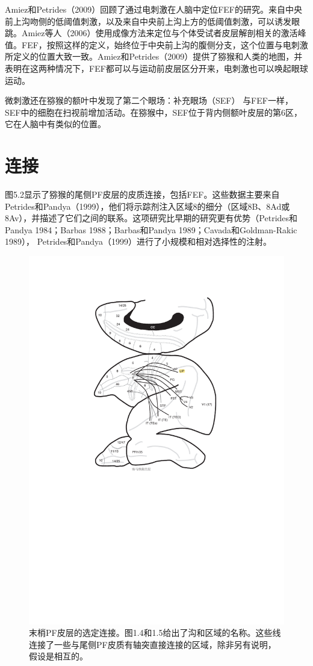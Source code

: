 Amiez和Petrides（2009）回顾了通过电刺激在人脑中定位FEF的研究。来自中央前上沟吻侧的低阈值刺激，以及来自中央前上沟上方的低阈值刺激，可以诱发眼跳。Amiez等人（2006）使用成像方法来定位与个体受试者皮层解剖相关的激活峰值。FEF，按照这样的定义，始终位于中央前上沟的腹侧分支，这个位置与电刺激所定义的位置大致一致。Amiez和Petrides（2009）提供了猕猴和人类的地图，并表明在这两种情况下，FEF都可以与运动前皮层区分开来，电刺激也可以唤起眼球运动。

微刺激还在猕猴的额叶中发现了第二个眼场：补充眼场（SEF） \cite{Schlag & Schlag-Rey 1987}与FEF一样，SEF中的细胞在扫视前增加活动\cite{Hanes et al. 1995}。在猕猴中，SEF位于背内侧额叶皮层的第6区\cite{Schlag & Schlag-Rey 1987;Olson & Gettner 1999}，它在人脑中有类似的位置\cite{Amiez & Petrides 2009}。
\section{连接}
图5.2显示了猕猴的尾侧PF皮层的皮质连接，包括FEF。这些数据主要来自Petrides和Pandya（1999），他们将示踪剂注入区域8的细分（区域8B、8Ad或8Av），并描述了它们之间的联系。这项研究比早期的研究更有优势（Petrides和Pandya 1984；Barbas 1988；Barbas和Pandya 1989；Cavada和Goldman-Rakic 1989）， Petrides和Pandya（1999）进行了小规模和相对选择性的注射。
\begin{figure}
	\centering
	\includegraphics[width=0.7\linewidth]{image_pfc/Fig_5_2}
	\caption{末梢PF皮层的选定连接。图1.4和1.5给出了沟和区域的名称。这些线连接了一些与尾侧PF皮质有轴突直接连接的区域，除非另有说明，假设是相互的。}
	\label{fig:fig}
\end{figure}


